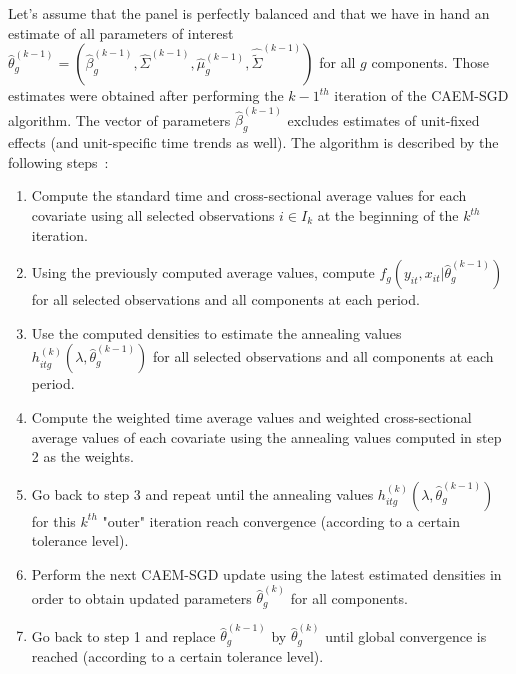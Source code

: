 \documentclass[11pt,letter]{article}
\begin{document}
\par
Let's assume that the panel is perfectly balanced and that we have in hand an estimate of all parameters of interest $\hat{\theta}_g^{(k-1)} = (\hat{\beta}_g^{(k-1)},\hat{\Sigma}^{(k-1)},\hat{\mu}^{(k-1)}_g,\hat{\tilde{\Sigma}}^{(k-1)})$ for all $g$ components. Those estimates were obtained after performing the $k-1^{th}$ iteration of the CAEM-SGD algorithm. The vector of parameters $\hat{\beta}_g^{(k-1)}$ excludes estimates of unit-fixed effects (and unit-specific time trends as well). The algorithm is described by the following steps~:
\begin{enumerate}
	\item Compute the standard time and cross-sectional average values for each covariate using all selected observations $i\in I_k$ at the beginning of the $k^{th}$ iteration.
	\item Using the previously computed average values, compute $f_g(y_{it},x_{it}|\hat{\theta}_g^{(k-1)})$ for all selected observations and all components at each period.
	\item Use the computed densities to estimate the annealing values $h_{itg}^{(k)}(\lambda,\hat{\theta}_g^{(k-1)})$ for all selected observations and all components at each period.
	\item Compute the weighted time average values and weighted cross-sectional average values of each covariate using the annealing values computed in step 2 as the weights.
	\item Go back to step 3 and repeat until the annealing values $h_{itg}^{(k)}(\lambda,\hat{\theta}_g^{(k-1)})$ for this $k^{th}$ "outer" iteration reach convergence (according to a certain tolerance level).
	\item Perform the next CAEM-SGD update using the latest estimated densities in order to obtain updated parameters $\hat{\theta}_g^{(k)}$ for all components.
	\item Go back to step 1 and replace $\hat{\theta}_g^{(k-1)}$ by $\hat{\theta}_g^{(k)}$ until global convergence is reached (according to a certain tolerance level).
\end{enumerate} 
\end{document}
